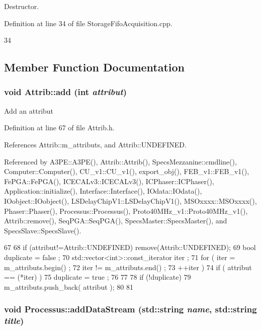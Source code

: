 Destructor. 

Definition at line 34 of file StorageFifoAcquisition.cpp.


\begin{DoxyCode}
34 {} 
\end{DoxyCode}


\subsection{Member Function Documentation}
\hypertarget{classAttrib_a235f773af19c900264a190b00a3b4ad7}{
\subsubsection[{add}]{\setlength{\rightskip}{0pt plus 5cm}void Attrib::add (int {\em attribut})}}
\label{classAttrib_a235f773af19c900264a190b00a3b4ad7}
Add an attribut 

Definition at line 67 of file Attrib.h.

References Attrib::m\_\-attributs, and Attrib::UNDEFINED.

Referenced by A3PE::A3PE(), Attrib::Attrib(), SpecsMezzanine::cmdline(), Computer::Computer(), CU\_\-v1::CU\_\-v1(), export\_\-obj(), FEB\_\-v1::FEB\_\-v1(), FePGA::FePGA(), ICECALv3::ICECALv3(), ICPhaser::ICPhaser(), Application::initialize(), Interface::Interface(), IOdata::IOdata(), IOobject::IOobject(), LSDelayChipV1::LSDelayChipV1(), MSOxxxx::MSOxxxx(), Phaser::Phaser(), Processus::Processus(), Proto40MHz\_\-v1::Proto40MHz\_\-v1(), Attrib::remove(), SeqPGA::SeqPGA(), SpecsMaster::SpecsMaster(), and SpecsSlave::SpecsSlave().


\begin{DoxyCode}
67                             {
68     if (attribut!=Attrib::UNDEFINED) remove(Attrib::UNDEFINED);
69     bool duplicate = false ;
70     std::vector<int>::const_iterator iter ;
71     for ( iter  = m_attributs.begin() ;
72           iter != m_attributs.end()   ;
73           ++iter ) {
74       if ( attribut == (*iter) ) {
75         duplicate = true ;
76       }
77     }
78     if (!duplicate) {
79       m_attributs.push_back( attribut );
80     }
81   }
\end{DoxyCode}
\hypertarget{classProcessus_a308c8f193802f1d1ab49d4447d0cb281}{
\subsubsection[{addDataStream}]{\setlength{\rightskip}{0pt plus 5cm}void Processus::addDataStream (std::string {\em name}, \/  std::string {\em title})}}
\label{classProcessus_a308c8f193802f1d1ab49d4447d0cb281}


